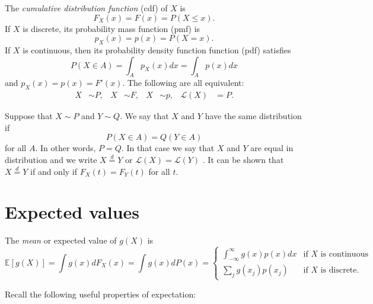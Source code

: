 \documentclass[10pt]{article}
\newcommand{\Expect}[1]{\mathbb{E}\!\left[#1\right]}
\begin{document}
The {\em cumulative distribution function} (cdf) of $X$ is
\begin{equation}
  F_X(x) = F(x) = P(X \leq x).\label{eq:2}
\end{equation}
If $X$ is discrete, its probability mass function (pmf) is
\begin{equation}
p_X(x) = p(x) = P(X = x).\label{eq:3}
\end{equation}
If $X$ is continuous, then its probability density function function (pdf) satisfies
\begin{equation}
P(X \in A) = \int_A p_X(x)dx = \int_A p(x)dx\label{eq:4}
\end{equation}
and $p_X(x) = p(x) = F'(x)$. The following are all equivalent:
\begin{align}
  X&\sim P,& X&\sim F, & X&\sim p, & \mathcal{L}(X)&=P.
\end{align}

Suppose that $X \sim P$ and $Y \sim Q$. We say that $X$ and $Y$ have
the same distribution if
\begin{equation}
  P(X\in A)=Q(Y \in A)\label{eq:5}
\end{equation}
for all $A$. In other words, $P = Q$. In that case we say that $X$ and
$Y$ are equal in distribution and we write $X \overset{d}{=} Y$ or
$\mathcal{L}(X) = \mathcal{L}(Y)$ . It can be shown that $X
\overset{d}{=} Y$ if and only if 
$F_X(t) = F_Y (t)$ for all $t$.

\section{Expected values}
\label{sec:expected-values}

The {\em mean} or expected value of $g(X)$ is
\begin{equation}
  \label{eq:6}
  \Expect{g(X)} = \int g(x)dF_X(x) = \int g(x) dP(x) = \begin{cases}
    \int_{-\infty}^{\infty} g(x)p(x)dx & \mbox{if $X$ is continuous}\\
    \sum_j g(x_j)p(x_j) & \mbox{if $X$ is discrete.}
  \end{cases}
\end{equation}

Recall the following useful properties of expectation:
\end{document}
